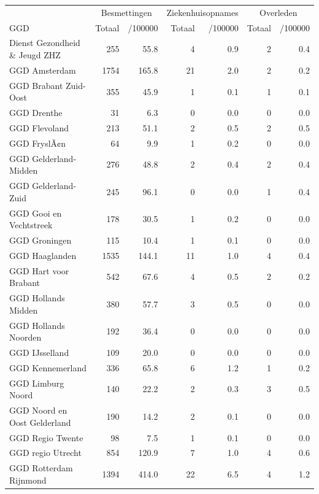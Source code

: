 \documentclass[
  english,
  man,floatsintext]{apa6}
\begin{document}
\begin{table}[H]
\centering\begingroup\fontsize{10}{12}\selectfont

\begin{threeparttable}
\begin{tabular}{lrrrrrr}
\toprule
\multicolumn{1}{c}{ } & \multicolumn{2}{c}{Besmettingen} & \multicolumn{2}{c}{Ziekenhuisopnames} & \multicolumn{2}{c}{Overleden} \\
\cmidrule(l{3pt}r{3pt}){2-3} \cmidrule(l{3pt}r{3pt}){4-5} \cmidrule(l{3pt}r{3pt}){6-7}
GGD & Totaal & /100000 & Totaal & /100000 & Totaal & /100000\\
\midrule
Dienst Gezondheid \& Jeugd ZHZ & 255 & 55.8 & 4 & 0.9 & 2 & 0.4\\
GGD Amsterdam & 1754 & 165.8 & 21 & 2.0 & 2 & 0.2\\
GGD Brabant Zuid-Oost & 355 & 45.9 & 1 & 0.1 & 1 & 0.1\\
GGD Drenthe & 31 & 6.3 & 0 & 0.0 & 0 & 0.0\\
GGD Flevoland & 213 & 51.1 & 2 & 0.5 & 2 & 0.5\\
GGD FryslÃ¢n & 64 & 9.9 & 1 & 0.2 & 0 & 0.0\\
GGD Gelderland-Midden & 276 & 48.8 & 2 & 0.4 & 2 & 0.4\\
GGD Gelderland-Zuid & 245 & 96.1 & 0 & 0.0 & 1 & 0.4\\
GGD Gooi en Vechtstreek & 178 & 30.5 & 1 & 0.2 & 0 & 0.0\\
GGD Groningen & 115 & 10.4 & 1 & 0.1 & 0 & 0.0\\
GGD Haaglanden & 1535 & 144.1 & 11 & 1.0 & 4 & 0.4\\
GGD Hart voor Brabant & 542 & 67.6 & 4 & 0.5 & 2 & 0.2\\
GGD Hollands Midden & 380 & 57.7 & 3 & 0.5 & 0 & 0.0\\
GGD Hollands Noorden & 192 & 36.4 & 0 & 0.0 & 0 & 0.0\\
GGD IJsselland & 109 & 20.0 & 0 & 0.0 & 0 & 0.0\\
GGD Kennemerland & 336 & 65.8 & 6 & 1.2 & 1 & 0.2\\
GGD Limburg Noord & 140 & 22.2 & 2 & 0.3 & 3 & 0.5\\
GGD Noord en Oost Gelderland & 190 & 14.2 & 2 & 0.1 & 0 & 0.0\\
GGD Regio Twente & 98 & 7.5 & 1 & 0.1 & 0 & 0.0\\
GGD regio Utrecht & 854 & 120.9 & 7 & 1.0 & 4 & 0.6\\
GGD Rotterdam Rijnmond & 1394 & 414.0 & 22 & 6.5 & 4 & 1.2\\

\end{tabular}
\end{threeparttable}
\end{table}
\end{document}
